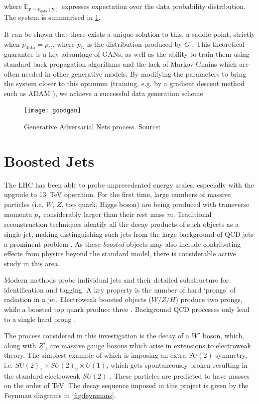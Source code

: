 \documentclass{report}
\begin{document}
where  $\mathbb{E}_{\mathbf{y}\sim p_{\text{data}}(\mathbf{y})}$ expresses expectation over the data probability distribution. The system is summarised in \cref{fig:gandiag}.

It can be shown that there exists a unique solution to this, a saddle point, strictly when $p_{\text{data}} = p_G$, where $p_G$ is the distribution produced by $G$ \cite{gan1}. This theoretical guarantee is a key advantage of GANs, as well as the ability to train them using standard back propagation algorithms and the lack of Markov Chains which are often needed in other generative models. By modifying the parameters to bring the system closer to this optimum (training, e.g. by a gradient descent method such as ADAM \cite{adam}), we achieve a successful data generation scheme.   

\begin{figure}[H]
	\centering
	\texttt{[image: goodgan]}
	
	\caption{Generative Adversarial Nets process. Source: \cite{GoodfellowNips}}
	\label{fig:gandiag}
	
\end{figure}
 

\section{Boosted Jets}

The LHC has been able to probe unprecedented energy scales, especially with the upgrade to \SI{13}{\tera\electronvolt} operation. For the first time, large numbers of massive particles (i.e. $W$, $Z$, top quark, Higgs boson) are being produced with transverse momenta $p_T$ considerably larger than their rest mass $m$. Traditional reconstruction techniques identify all the decay products of such objects as a single jet, making distinguishing such jets from the large background of QCD jets a prominent problem \cite{BOOST}. As these \textit{boosted} objects may also include contributing effects from physics beyond the standard model, there is considerable active study in this area.

Modern methods probe individual jets and their detailed substructure for identification and tagging. A key property is the number of hard `prongs' of radiation in a jet. Electroweak boosted objects ($W/Z/H$) produce two prongs, while a boosted top quark produce three \cite{nsubjettiness}. Background QCD processes only lead to a single hard prong \cite{prongs}.

The process considered in this investigation is the decay of a $W'$ boson, which, along with $Z'$, are massive gauge bosons which arise in extensions to electroweak theory. The simplest example of which is imposing an extra $SU(2)$ symmetry, i.e. $SU(2)_1 \times SU(2)_2 \times U(1)$, which gets spontaneously broken resulting in the standard electroweak $SU(2)$ \cite{pdg2012}. These particles are predicted to have masses on the order of \si{\tera\electronvolt}. The decay sequence imposed in this project is given by the Feynman diagrams in \cref{fig:feynmans}.
\end{document}
